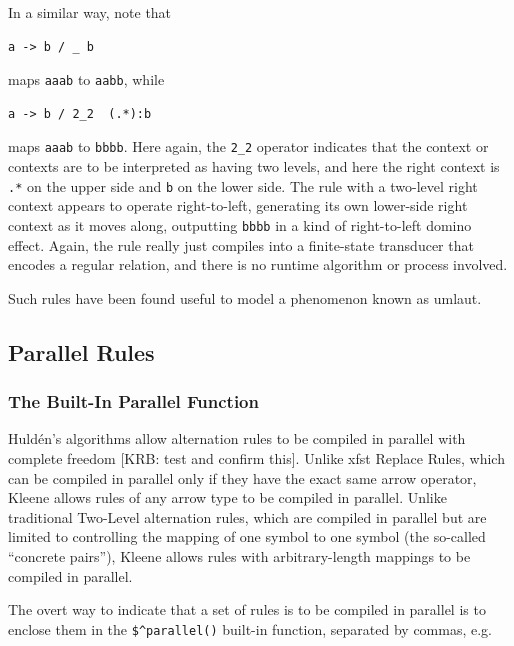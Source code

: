 \documentclass[letterpaper,12pt]{article}
\begin{document}
In a similar way, note that

\begin{Verbatim}[fontsize=\small]
a -> b / _ b
\end{Verbatim}

\noindent
maps \texttt{aaab} to \texttt{aabb}, while

\begin{Verbatim}[fontsize=\small]
a -> b / 2_2  (.*):b
\end{Verbatim}

\noindent
maps \texttt{aaab} to \texttt{bbbb}.  Here again, the \verb!2_2! operator indicates that the context or contexts are to
be interpreted as having two levels, and here the right context is \verb!.*! on the upper side and \verb!b! on the lower
side.  The rule with a two-level right context appears to
operate right-to-left, generating its own lower-side right context as it moves along, outputting \texttt{bbbb} in a kind
of right-to-left domino effect.
Again, the rule really just compiles into a finite-state transducer that encodes a regular
relation, and there is no runtime algorithm or process involved.

Such rules have been found useful to model a phenomenon known as umlaut.



\subsection{Parallel Rules}

\subsubsection{The Built-In Parallel Function}

Huld\'en's algorithms allow alternation rules to be compiled in parallel with complete freedom [KRB:  test and confirm
this].  Unlike xfst Replace Rules, which can be compiled in parallel only if they have the exact same arrow operator,
Kleene allows rules of any arrow type to be compiled in parallel.  Unlike traditional Two-Level alternation rules, which are
compiled in parallel but are
limited to controlling the mapping of one symbol to one symbol (the so-called ``concrete pairs''), Kleene allows
rules with arbitrary-length mappings to be compiled in parallel.

The overt way to indicate that a set of rules is to be compiled in parallel is to enclose them in the \verb!$^parallel()!
built-in function, separated by commas, e.g.
\end{document}
